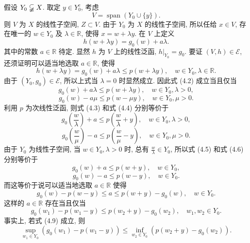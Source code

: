 \documentclass[openany]{ctexbook}
\makeatletter
\theoremstyle{kaiti}
\theoremstyle{normal}
\renewenvironment{proof}[1][\proofname]{\par
    \pushQED{\qed}%
    \normalfont \topsep6\p@\@plus6\p@\relax
    \trivlist
    \item\relax
    {\heiti #1}\hspace{2\labelsep}\ignorespaces
  }{%
    \popQED\endtrivlist\@endpefalse
  }
\makeatother
\begin{document}
\begin{proof}
假设 $Y_0 \varsubsetneqq X$. 取定 $y \in Y_0^{c}$, 考虑
$$
V=\operatorname{span}\left(Y_0 \cup\{y\}\right).
$$
则 $V$ 为 $X$ 的线性子空间, $Z \subset V$. 由于 $Y_0$ 为 $X$ 的线性子空间, 所以任给 $x \in V$, 存在唯一的 $w \in Y_0$ 及 $\lambda \in \mathbb{R}$, 使得 $x=w+\lambda y$. 在 $V$ 上定义
$$
h(w+\lambda y)=g_0(w)+a \lambda.
$$
其中的常数 $a \in \mathbb{R}$ 待定. 显然 $h$ 为 $V$ 上的线性泛函, $\left.h\right|_{Y_0}=g_0$. 要证 $(V, h) \in \mathcal{E}$, 还须证明可以适当地选取 $a \in \mathbb{R}$, 使得
\begin{equation}
  h(w+\lambda y)=g_0(w)+a \lambda \leqslant p(w+\lambda y), \quad w \in Y_0, \lambda \in \mathbb{R}.
\end{equation}
由于 $\left(Y_0, g_0\right) \in \mathcal{E}$, 所以上式当 $\lambda=0$ 时显然成立. 因此式 (4.2) 成立当且仅当
\begin{equation}
  g_0(w)+a \lambda \leqslant p(w+\lambda y),\quad w \in Y_0, \lambda>0,
\end{equation}
\begin{equation}
  g_0(w)-a \mu \leqslant p(w-\mu y),\quad w \in Y_0, \mu>0.
\end{equation}
利用 $p$ 为次线性泛函, 则式 (4.3) 和式 (4.4) 分别等价于
\begin{equation}
  g_0\left(\frac{w}{\lambda}\right)+a \leqslant p\left(\frac{w}{\lambda}+y\right),\quad w \in Y_0, \lambda>0,
\end{equation}
\begin{equation}
  g_0\left(\frac{w}{\mu}\right)-a \leqslant p\left(\frac{w}{\mu}-y\right),\quad w \in Y_0, \mu>0.
\end{equation}
由于 $Y_0$ 为线性子空间, 当 $w \in Y_0, \lambda>0$ 时, 总有 $\frac{w}{\lambda} \in Y_0$, 所以式 (4.5) 和式 (4.6) 分别等价于
\begin{equation}
  g_0(w)+a \leqslant p(w+y),\quad w \in Y_0,
\end{equation}
\begin{equation}
  g_0(w)-a \leqslant p(w-y),\quad w \in Y_0.
\end{equation}
而这等价于说可以适当地选取 $a \in \mathbb{R}$ 使得
$$
g_0(w)-p(w-y) \leqslant a \leqslant p(w+y)-g_0(w), \quad w \in Y_0.
$$
这样的 $a \in \mathbb{R}$ 存在当且仅当
\begin{equation}
  g_0\left(w_1\right)-p\left(w_1-y\right) \leqslant p\left(w_2+y\right)-g_0\left(w_2\right), \quad w_1, w_2 \in Y_0.
\end{equation}
事实上, 若式 (4.9) 成立, 则
$$
\sup_{w_1 \in Y_0}\left(g_0\left(w_1\right)-p\left(w_1-y\right)\right) \leqslant \inf_{w_2 \in Y_0}\left(p\left(w_2+y\right)-g_0\left(w_2\right)\right).
$$
\end{proof}
\end{document}
